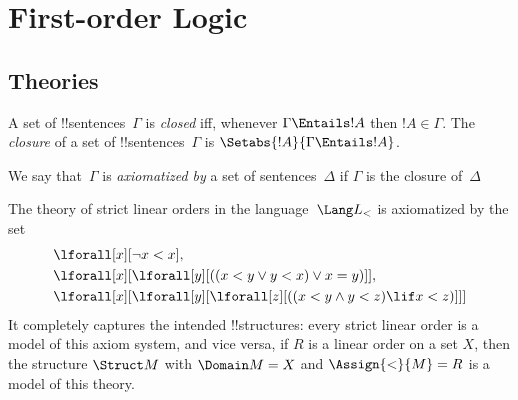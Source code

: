 \OLEndChapterHook

\appendix

\let\intro\comment
\let\endintro\endcomment

\chapter{First-order Logic}










\section{Theories}

\begin{defn}
A set of !!{sentence}s~$\Gamma$ is \emph{closed} iff, whenever
$\Gamma \Entails !A$ then $!A \in \Gamma$.  The \emph{closure} of a set
of !!{sentence}s~$\Gamma$ is $\Setabs{!A}{\Gamma \Entails !A}$.

We say that~$\Gamma$ is \emph{axiomatized by} a set of
sentences~$\Delta$ if $\Gamma$ is the closure of~$\Delta$
\end{defn}

\begin{ex}
The theory of strict linear orders in the language~$\Lang L_<$ is
axiomatized by the set
\begin{align*}
& \lforall[x][\lnot x < x], \\
& \lforall[x][\lforall[y][((x < y \lor y <
    x) \lor x = y)]], \\
& \lforall[x][\lforall[y][\lforall[z][((x < y
      \land y < z) \lif x < z)]]]
\end{align*}
It completely captures the intended !!{structure}s: every strict
linear order is a model of this axiom system, and vice versa, if $R$
is a linear order on a set $X$, then the structure $\Struct M$ with
$\Domain M = X$ and $\Assign{<}{M} = R$ is a model of this theory.
\end{ex}


